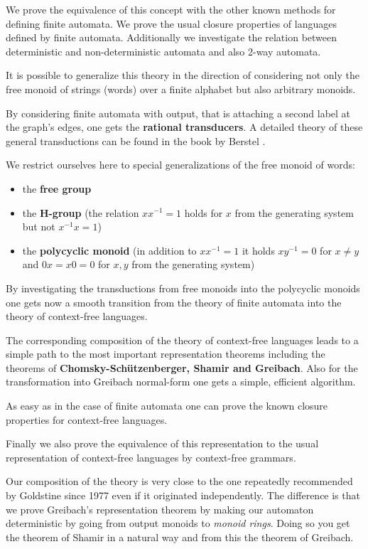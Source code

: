 We prove the equivalence of this concept with the other known methods for
defining finite automata. We prove the usual closure properties of languages defined
 by finite automata. Additionally we investigate the relation between
deterministic and non-deterministic automata and also 2-way automata.

It is possible to generalize this theory in the direction of considering not
only the free monoid of strings (words) over a finite alphabet but also
arbitrary monoids.

By considering finite automata with output, that is attaching a
second label at the graph's edges, one gets the {\bf rational transducers}. A
detailed theory of these general transductions can be found in the book by
Berstel \cite{Berstel79}.

We restrict ourselves here to special generalizations of the free monoid of
words:
\begin{itemize}
  \item the {\bf free group}
  \item the {\bf H-group} (the relation $x x^{-1} = 1$ holds for $x$ from
  the generating system but not $x^{-1} x = 1$)
	\item the {\bf polycyclic monoid} (in addition to $x x^{-1} = 1$ it holds 
	$x y^{-1} = 0$ for $x \neq y$ and $0 x = x 0 = 0$ for $x,y$ from the generating
	system)
\end{itemize}

By investigating the transductions from free monoids into the polycyclic
monoids one gets now a smooth transition from the theory of finite automata into
the theory of context-free languages.

The corresponding composition of the theory of context-free languages leads to
a simple path to the most important representation theorems including the
theorems of {\bf Chomsky-Schützenberger, Shamir and Greibach}. Also for the
transformation into Greibach normal-form one gets a simple, efficient
algorithm.

As easy as in the case of finite automata one can prove the known closure
properties for context-free languages.

Finally we also prove the equivalence of this representation to the
usual representation of context-free languages by context-free grammars.

Our composition of the theory is very close to the one repeatedly recommended by
Goldstine since 1977 even if it originated independently. The
difference is that we prove Greibach's representation theorem by making our 
automaton deterministic by going from output monoids to {\em monoid
rings}. Doing so you get the theorem of Shamir in a natural way and from this
the theorem of Greibach.

